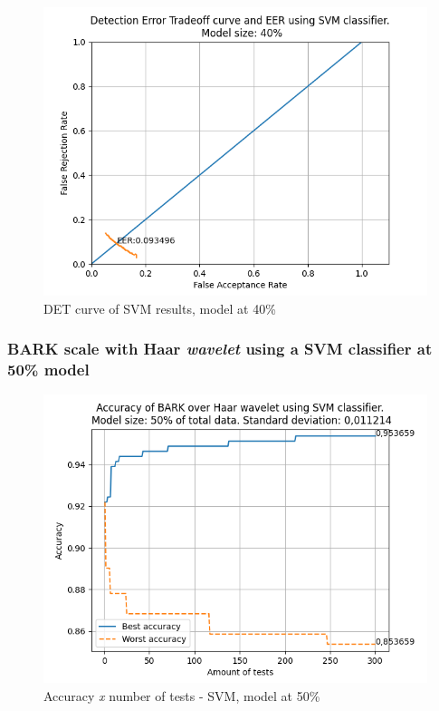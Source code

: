 			\begin{figure}[H]
				\centering
				\includegraphics[scale=.6]{images/results/det/DET_SVM_40}
				\caption{DET curve of SVM results, model at 40\%}
				\label{fig:detsvm40}
			\end{figure}
		
			
		
		\subsubsection{BARK scale with Haar \textit{wavelet} using a SVM classifier at 50\% model}
			
			\begin{figure}[!h]
				\centering
				\includegraphics[scale=.6]{images/results/confusionMatrices/classifier_SVM_50.png}
				\caption{Accuracy \textit{x} number of tests - SVM, model at 50\%}
				\label{fig:classifiersvm50}
			\end{figure}
			
